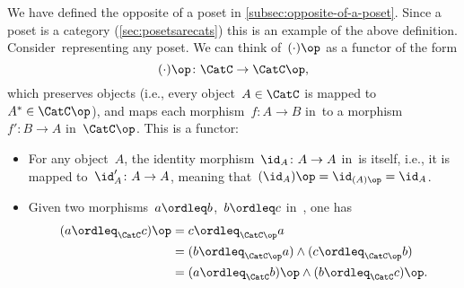 \begin{example}
  We have defined the opposite of a poset in \cref{subsec:opposite-of-a-poset}.
  Since a poset is a category (\cref{sec:posetsarecats})
  this is an example of the above definition. Consider~\CatC representing any poset. We can think of~$(\cdot)\op$ as a functor of the form
  \begin{equation}
    (\cdot)\op\colon \CatC \to \CatC\op,
  \end{equation}
  which preserves objects (i.e., every object~$A \in \CatC$ is mapped to~$A^*\in \CatC\op$), and maps each morphism~$f\colon A\to B$ in~\CatC to a morphism~$f'\colon B\to A$ in~$\CatC\op$. This is a functor:
  \begin{itemize}
    \item For any object~$A$, the identity morphism~$\id_A\colon A\to A$ in~\CatC is itself, i.e., it is mapped to~$\id_A'\colon A\to A$, meaning that~$(\id_A)\op=\id_{(A)\op}=\id_A$.
    \item Given two morphisms~$a\ordleq b$,~$b\ordleq c$ in~\CatC, one has
    \begin{equation}
      \begin{aligned}
        (a\ordleq_{\CatC} c)\op &=c\ordleq_{\CatC\op} a\\
        &=(b\ordleq_{\CatC\op} a)\wedge (c\ordleq_{\CatC\op}b)\\
        &=(a\ordleq_{\CatC} b)\op \wedge (b\ordleq_{\CatC} c)\op.
      \end{aligned}
    \end{equation}
  \end{itemize}
\end{example}








